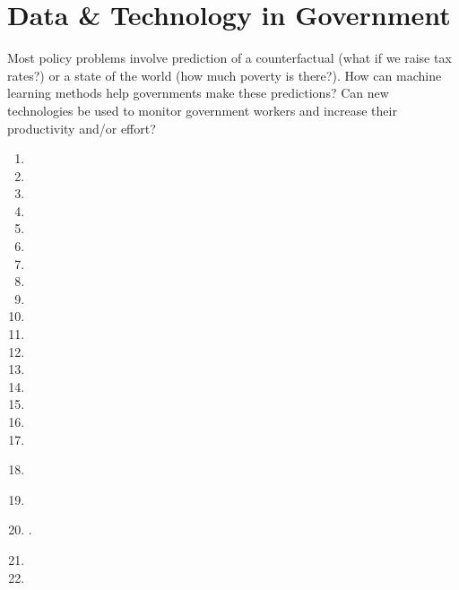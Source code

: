 \documentclass[11pt]{article}
\begin{document}
\section{Data \& Technology in Government}
Most policy problems involve prediction of a counterfactual (what if we raise tax rates?) or a state of the world (how much poverty is there?). How can machine learning methods help governments make these predictions? Can new technologies be used to monitor government workers and increase their productivity and/or effort?

\begin{enumerate}
\item {}
\item {}
\item {}
\item {}
\item {}
\item {}
\item {}
\item {}
\item {}
\item {}
\item {}
\item {}
\item {}
\item {}
\item {}
\item {}
\item {}
\item \textbf{}
\item \textbf{}
\item {}.
\item {}
\item {}
\end{enumerate}


\end{document}
